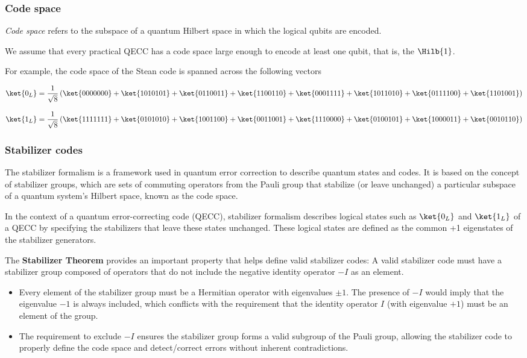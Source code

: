 \subsubsection*{Code space}

\textit{Code space} refers to the subspace of a quantum Hilbert space in which the logical qubits
are encoded.

We assume that every practical QECC has a code space large enough to encode at least one qubit, that
is, the $\Hilb{1}$.

\vsp

For example, the code space of the Stean code is spanned across the following vectors

\[
\ket{0_L} = \frac{1}{\sqrt{8}} \left( \ket{0000000} + \ket{1010101} + \ket{0110011} + \ket{1100110}
+ \ket{0001111} + \ket{1011010} + \ket{0111100} + \ket{1101001} \right)
\]

\vsp

\[
\ket{1_L} = \frac{1}{\sqrt{8}} \left( \ket{1111111} + \ket{0101010} + \ket{1001100} + \ket{0011001}
+ \ket{1110000} + \ket{0100101} + \ket{1000011} + \ket{0010110} \right)
\]


\subsubsection*{Stabilizer codes}

The stabilizer formalism is a framework used in quantum error correction to describe quantum states
and codes. It is based on the concept of stabilizer groups, which are sets of commuting operators
from the Pauli group that stabilize (or leave unchanged) a particular subspace of a quantum system's
Hilbert space, known as the code space.

\vsp

In the context of a quantum error-correcting code (QECC), stabilizer formalism describes logical
states such as \(\ket{0_L}\) and \(\ket{1_L}\) of a QECC by specifying the stabilizers that leave
these states unchanged.  These logical states are defined as the common +1 eigenstates of the
stabilizer generators.

\vsp

The \textbf{Stabilizer Theorem} provides an important property that helps define valid stabilizer
codes: A valid stabilizer code must have a stabilizer group composed of operators that do not
include the negative identity operator \(-I\) as an element.

\begin{itemize}
  \item Every element of the stabilizer group must be a Hermitian operator with eigenvalues \( \pm 1
\). The presence of \(-I\) would imply that the eigenvalue \(-1\) is always included, which
conflicts with the requirement that the identity operator \(I\) (with eigenvalue \(+1\)) must be an
element of the group.
  \item The requirement to exclude \(-I\) ensures the stabilizer group forms a valid subgroup of the
Pauli group, allowing the stabilizer code to properly define the code space and detect/correct
errors without inherent contradictions.
\end{itemize}

